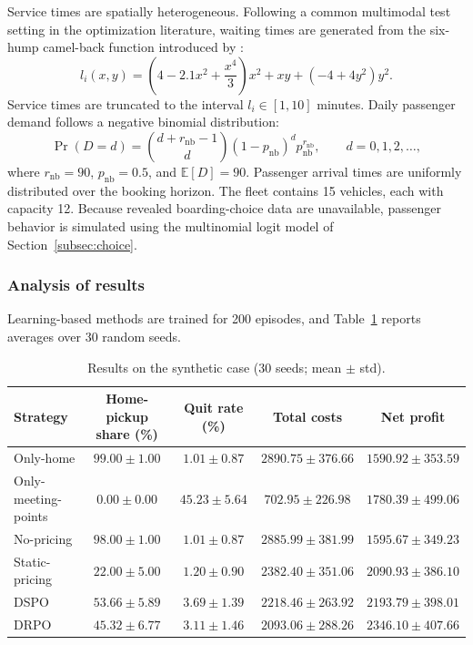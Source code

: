 \documentclass[preprint,12pt,authoryear]{elsarticle}
\begin{document}
Service times are spatially heterogeneous. Following a common multimodal test setting in the optimization literature, waiting times are generated from the six-hump camel-back function introduced by \citet{molga2005}:
\begin{equation}
l_i(x,y) = \left(4-2.1x^2+\frac{x^4}{3}\right)x^2 + xy + \left(-4+4y^2\right)y^2.
\tag{34}\label{eq:camel}
\end{equation}
Service times are truncated to the interval $l_i\in[1,10]$ minutes. Daily passenger demand follows a negative binomial distribution:
\begin{equation}
\Pr(D=d) = \binom{d+r_{\mathrm{nb}}-1}{d}(1-p_{\mathrm{nb}})^d p_{\mathrm{nb}}^{r_{\mathrm{nb}}},
\qquad
d=0,1,2,\ldots,
\tag{35}\label{eq:nb}
\end{equation}
where $r_{\mathrm{nb}}=90$, $p_{\mathrm{nb}}=0.5$, and $\mathbb{E}[D]=90$. Passenger arrival times are uniformly distributed over the booking horizon. The fleet contains 15 vehicles, each with capacity 12. Because revealed boarding-choice data are unavailable, passenger behavior is simulated using the multinomial logit model of Section~\ref{subsec:choice}.

\subsubsection{Analysis of results}

Learning-based methods are trained for 200 episodes, and Table~\ref{tab:synthetic} reports averages over 30 random seeds.

\begin{table}[t]
\centering
\caption{Results on the synthetic case (30 seeds; mean $\pm$ std).}
\label{tab:synthetic}
\small
\begin{tabular}{lcccc}
\toprule
Strategy & Home-pickup share (\%) & Quit rate (\%) & Total costs & Net profit \\
\midrule
Only-home & $99.00 \pm 1.00$ & $1.01 \pm 0.87$ & $2890.75 \pm 376.66$ & $1590.92 \pm 353.59$ \\
Only-meeting-points & $0.00 \pm 0.00$ & $45.23 \pm 5.64$ & $702.95 \pm 226.98$ & $1780.39 \pm 499.06$ \\
No-pricing & $98.00 \pm 1.00$ & $1.01 \pm 0.87$ & $2885.99 \pm 381.99$ & $1595.67 \pm 349.23$ \\
Static-pricing & $22.00 \pm 5.00$ & $1.20 \pm 0.90$ & $2382.40 \pm 351.06$ & $2090.93 \pm 386.10$ \\
DSPO & $53.66 \pm 5.89$ & $3.69 \pm 1.39$ & $2218.46 \pm 263.92$ & $2193.79 \pm 398.01$ \\
DRPO & $45.32 \pm 6.77$ & $3.11 \pm 1.46$ & $2093.06 \pm 288.26$ & $2346.10 \pm 407.66$ \\
\bottomrule
\end{tabular}
\end{table}
\end{document}
